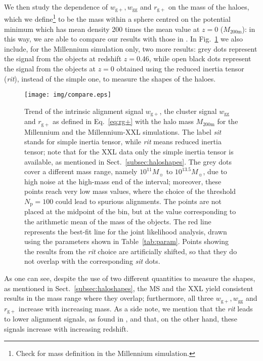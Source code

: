\documentclass[a4paper,fleqn,usenatbib]{mnras}
\begin{document}
We then study the dependence of $w_{\mathrm{g+}}, w_{\mathrm{gg}}$ and $r_{\mathrm{g+}}$ on the mass of the haloes, which we define\footnote{Check for mass definition in the Millennium simulation.} to be the mass within a sphere centred on the potential minimum which has mean density 200 times the mean value at $z = 0$ ($M_{\mathrm{200m}}$): in this way, we are able to compare our results with those in \citet[figure 7]{vanUitertJoachimi2017}. In Fig.~\ref{fig:vsmass} we also include, for the Millennium simulation only, two more results: grey dots represent the signal from the objects at redshift $z = 0.46$, while open black dots represent the signal from the objects at $z = 0$ obtained using the reduced inertia tensor (\textit{rit}), instead of the simple one, to measure the shapes of the haloes.
\begin{figure}
	\centerline{
	\texttt{[image: img/compare.eps]}}
	\caption{Trend of the intrinsic alignment signal $w_{\mathrm{g+}}$, the cluster signal $w_{\mathrm{gg}}$ and $r_{\mathrm{g+}}$ as defined in Eq.~\ref{eq:rg+} with the halo mass $M_{\mathrm{200m}}$ for the Millennium and the Millennium-XXL simulations. The label \textit{sit} stands for simple inertia tensor, while \textit{rit} means reduced inertia tensor; note that for the XXL data only the simple inertia tensor is available, as mentioned in Sect.~\ref{subsec:haloshapes}. The grey dots cover a different mass range, namely $10^{11} M_{\sun}$ to $10^{13.5} M_{\sun}$, due to high noise at the high-mass end of the interval; moreover, these points reach very low mass values, where the choice of the threshold $N_{\mathrm{p}}=100$ could lead to spurious alignments. The points are not placed at the midpoint of the bin, but at the value corresponding to the arithmetic mean of the mass of the objects. The red line represents the best-fit line for the joint likelihood analysis, drawn using the parameters shown in Table~\ref{tab:param}. Points showing the results from the \textit{rit} choice are artificially shifted, so that they do not overlap with the corresponding \textit{sit} dots.}
	\label{fig:vsmass}
\end{figure}
As one can see, despite the use of two different quantities to measure the shapes, as mentioned in Sect.~\ref{subsec:haloshapes}, the MS and the XXL yield consistent results in the mass range where they overlap; furthermore, all three $w_{\mathrm{g+}}, w_{\mathrm{gg}}$ and $r_{\mathrm{g+}}$ increase with increasing mass. As a side note, we mention that the \textit{rit} leads to lower alignment signals, as found in \citet{Joachimietal2013b}, and that, on the other hand, these signals increase with increasing redshift.
\end{document}
